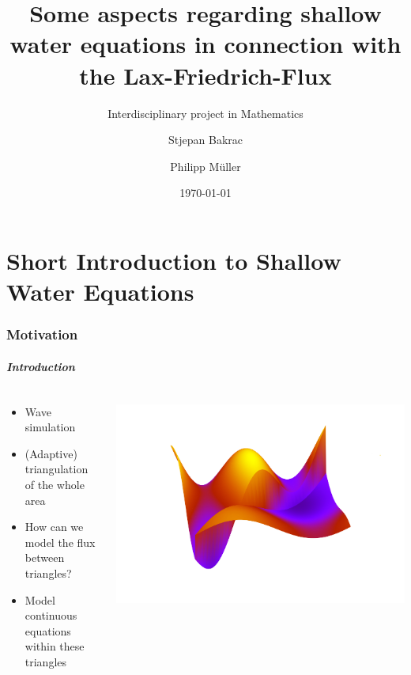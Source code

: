 \documentclass{beamer}
\title{Some aspects regarding shallow water equations in connection with the Lax-Friedrich-Flux}
\subtitle{Interdisciplinary project in Mathematics}
\author[S. Bakrac, P. Müller]{Stjepan Bakrac \and Philipp Müller}
\date{\today}
\institute[TU München]{Technische Universität München}
\newcommand{\todo}[1]{
  \textcolor{red}{TODO: #1}
  \note{\textcolor{red}{TODO: #1}}
}
\renewcommand{\todo}[1]{}
\begin{document}
\todo{Nicht vergessen, wieder reinzukommentieren!}

\part{Short Introduction to Shallow Water Equations}
\label{part:introduction}

\section{Motivation}

\begin{frame}
  \frametitle{Introduction}
  \begin{columns}
    \begin{column}{.5\textwidth}
      \begin{itemize}
      \item Wave simulation
      \item (Adaptive) triangulation of the whole area
      \item How can we model the flux between triangles?
      \item Model continuous equations within these triangles
      \end{itemize}    
    \end{column}
  \end{columns}
\end{frame}
\end{document}
